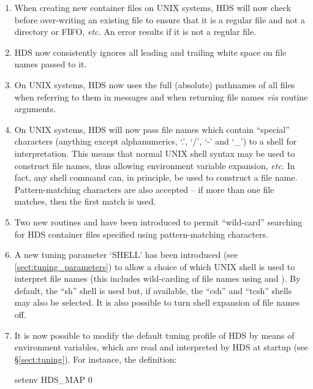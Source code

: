 \documentclass[twoside,11pt]{starlink}
\providecommand{\qt}[1]{``#1''}
\providecommand{\st}[1]{{\emph{#1}}}
\begin{document}
\begin{enumerate}
\item
When creating new container files on UNIX systems, HDS will now check
before over-writing an existing file to ensure that it is a regular
file and not a directory or FIFO, \st{etc.} An error results if it is
not a regular file.

\item
HDS now consistently ignores all leading and trailing white space on
file names passed to it.

\item
On UNIX systems, HDS now uses the full (absolute) pathnames of all
files when referring to them in messages and when returning file names
\st{via} routine arguments.

\item
On UNIX systems, HDS will now pass file names which contain
\qt{special} characters (anything except alphanumerics, `.', `/', `-'
and `\_') to a shell for interpretation. This means that normal UNIX
shell syntax may be used to construct file names, thus allowing
environment variable expansion, \st{etc.}  In fact, any shell command
can, in principle, be used to construct a file name.  Pattern-matching
characters are also accepted -- if more than one file matches, then
the first match is used.

\item
Two new routines  and
 have been introduced to permit
\qt{wild-card} searching for HDS container files specified using
pattern-matching characters.

\item
A new tuning parameter `SHELL' has been introduced (see
\ref{sect:tuning_parameters}) to allow a choice of which UNIX shell is
used to interpret file names (this includes wild-carding of file names
using  and
). By default, the \qt{sh} shell is
used but, if available, the \qt{csh} and \qt{tcsh} shells may also be
selected. It is also possible to turn shell expansion of file names
off.

\item
It is now possible to modify the default tuning profile of HDS by
means of environment variables, which are read and interpreted by HDS
at startup (see \S\ref{sect:tuning}). For instance, the definition:

\begin{small}
\begin{terminalv}
setenv HDS_MAP 0
\end{terminalv}
\end{small}


\end{enumerate}
\end{document}
